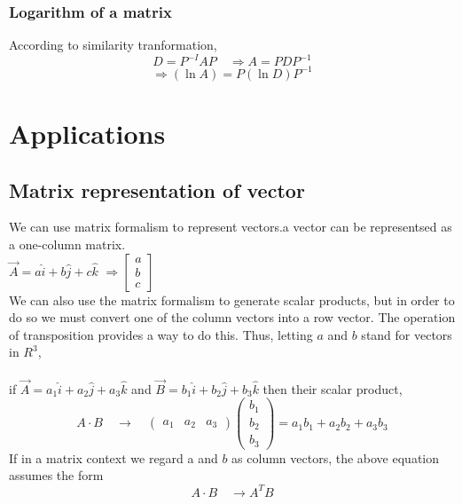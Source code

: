 \subsubsection{Logarithm of a matrix}
According to similarity tranformation, $$D=P^{-I} A P \quad \Rightarrow A=P D P^{-1}$$
$$
\Rightarrow(\ln A)=P(\ln D) P^{-1}
$$
\section{Applications}
\subsection{Matrix representation of vector}
We can use matrix formalism to represent vectors.a vector can be representsed as a one-column matrix.\\
$\vec{A}=a\hat{i}+b\hat{j}+c\hat{k}$
$\Longrightarrow \left[ \begin{array}{c}
	a\\b\\c\end{array}\right] $
\\We can also use the matrix formalism to generate scalar products, but in
order to do so we must convert one of the column vectors into a row vector. The operation
of transposition provides a way to do this. Thus, letting $a$ and $b$ stand for vectors in $R^{3}$,\\\\
if $\vec{A}=a_{1}\hat{i}+a_{2}\hat{j}+a_{3}\hat{k}$ and $\vec{B}=b_{1}\hat{i}+b_{2}\hat{j}+b_{3}\hat{k}$ then their scalar product,
$${A} \cdot {B} \quad \longrightarrow \quad\left(\begin{array}{lll}a_{1} & a_{2} & a_{3}\end{array}\right)\left(\begin{array}{l}b_{1} \\ b_{2} \\ b_{3}\end{array}\right)=a_{1} b_{1}+a_{2} b_{2}+a_{3} b_{3}$$
If in a matrix context we regard a and ${b}$ as column vectors, the above equation assumes the form
$$
{A} \cdot {B} \quad \longrightarrow  {A}^{T} {B}
$$
